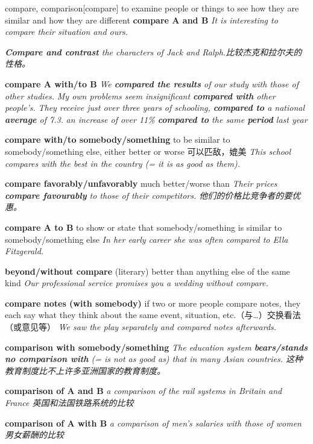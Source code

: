 \begin{DefWord}{compare, comparison}[compare]
    to examine people or things to see how they are similar and how they are different
    \textbf{compare A and B} \textit{It is interesting to compare their situation and ours.}

    \textit{\textbf{Compare and contrast} the characters of Jack and Ralph.比较杰克和拉尔夫的性格。}

    \textbf{compare A with/to B} 
    \textit{We \textbf{compared the results} of our study with those of other studies.}
    \textit{My own problems seem insignificant \textbf{compared with} other people's.}
    \textit{They receive just over three years of schooling, \textbf{compared to} a national \textbf{average} of 7.3.}
    \textit{an increase of over 11\% \textbf{compared to} the same \textbf{period} last year}

    \textbf{compare with/to somebody/something} to be similar to somebody/something else, either better or worse 可以匹敌，媲美
    \textit{This school compares with the best in the country (= it is as good as them).}

    \textbf{compare favorably/unfavorably} much better/worse than
    \textit{Their prices \textbf{compare favourably} to those of their competitors. 他们的价格比竞争者的要优惠。}



    \textbf{compare A to B} to show or state that somebody/something is similar to somebody/something else
    \textit{In her early career she was often compared to Ella Fitzgerald.}

    \textbf{beyond/without compare}
    (literary) better than anything else of the same kind
    \textit{Our professional service promises you a wedding without compare.}

    \textbf{compare notes (with somebody)}  
    if two or more people compare notes, they each say what they think about the same event, situation, etc.（与…）交换看法（或意见等）
    \textit{We saw the play separately and compared notes afterwards.}


    \textbf{comparison with somebody/something}
    \textit{The education system \textbf{bears/stands no comparison with} (= is not as good as) that in many Asian countries. 这种教育制度比不上许多亚洲国家的教育制度。}

    \textbf{comparison of A and B} \textit{a comparison of the rail systems in Britain and France 英国和法国铁路系统的比较}

    \textbf{comparison of A with B} \textit{a comparison of men’s salaries with those of women 男女薪酬的比较}


\end{DefWord}
